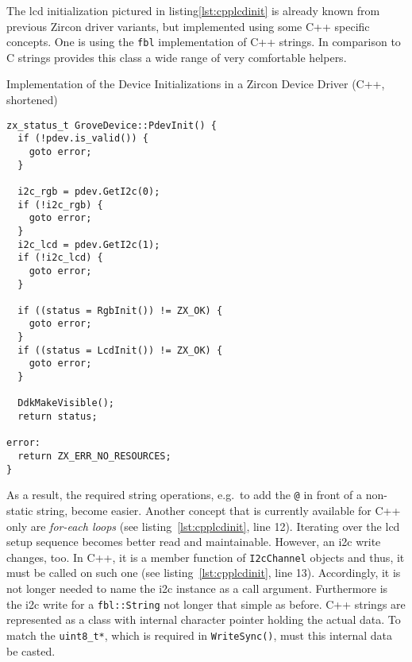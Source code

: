 The \ac{lcd} initialization pictured in listing\ref{lst:cpplcdinit} is already known from previous Zircon driver variants, but implemented using some C++ specific concepts.
One is using the \texttt{fbl} implementation of C++ strings.
In comparison to C strings provides this class a wide range of very comfortable helpers.
%
\begin{listing} [H]
    \caption{Implementation of the Device Initializations in a Zircon Device Driver (C++, shortened)}
\label{lst:cppinit}
\begin{verbatim}
zx_status_t GroveDevice::PdevInit() {
  if (!pdev.is_valid()) {
    goto error;
  }

  i2c_rgb = pdev.GetI2c(0);
  if (!i2c_rgb) {
    goto error;
  }
  i2c_lcd = pdev.GetI2c(1);
  if (!i2c_lcd) {
    goto error;
  }

  if ((status = RgbInit()) != ZX_OK) {
    goto error;
  }
  if ((status = LcdInit()) != ZX_OK) {
    goto error;
  }

  DdkMakeVisible();
  return status;

error:
  return ZX_ERR_NO_RESOURCES;
}
\end{verbatim}
\end{listing}
%
As a result, the required string operations, e.g.\ to add the \texttt{@} in front of a non-static string, become easier.
Another concept that is currently available for C++ only are \textit{for-each loops} (see listing~\ref{lst:cpplcdinit}, line 12).
Iterating over the \ac{lcd} setup sequence becomes better read and maintainable.
However, an \ac{i2c} write changes, too.
In C++, it is a member function of \texttt{I2cChannel} objects and thus, it must be called on such one (see listing~\ref{lst:cpplcdinit}, line 13).
Accordingly, it is not longer needed to name the \ac{i2c} instance as a call argument.
Furthermore is the \ac{i2c} write for a \texttt{fbl::String} not longer that simple as before.
C++ strings are represented as a class with internal character pointer holding the actual data.
To match the \texttt{uint8_t*}, which is required in \texttt{WriteSync()}, must this internal data be casted.
